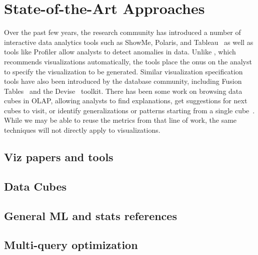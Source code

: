 \section{State-of-the-Art Approaches}
\label{sec:related_work}

Over the past few years, the research community has introduced 
a number of interactive data analytics tools such as ShowMe, Polaris, and
Tableau~\cite{DBLP:journals/cacm/StolteTH08, DBLP:journals/tvcg/MackinlayHS07}
as well as tools like Profiler allow analysts to detect anomalies in data.
Unlike \SeeDB, which recommends visualizations automatically, the tools place the
onus on the analyst to specify the visualization to be generated.
Similar visualization specification tools have also been introduced
by the database community, including Fusion Tables~\cite{DBLP:conf/sigmod/GonzalezHJLMSSG10} 
and the Devise~\cite{DBLP:conf/sigmod/LivnyRBCDLMW97} toolkit.
There has been some work on browsing data cubes in OLAP, allowing
analysts to find explanations, get suggestions for next cubes to visit,
or identify generalizations or patterns starting from a single cube~\cite{DBLP:conf/vldb/Sarawagi99, 
DBLP:conf/vldb/SatheS01, DBLP:conf/vldb/Sarawagi00}. 
While we may be able to reuse the metrics from that line of work,
the same techniques will not directly apply to visualizations.

\subsection{Viz papers and tools}
\subsection{Data Cubes}
\subsection{General ML and stats references}
\subsection{Multi-query optimization}